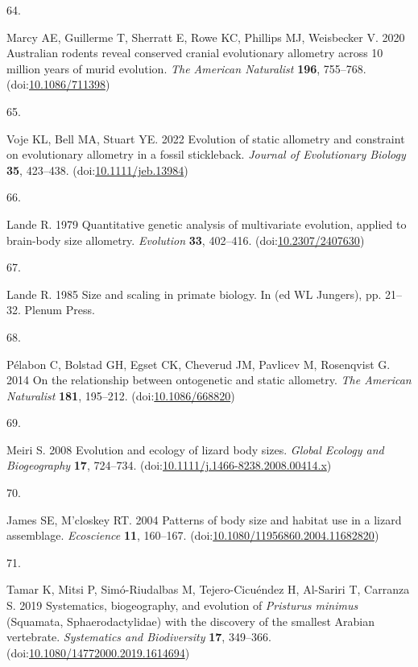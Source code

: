 \documentclass[
  11pt,
]{article}
\newlength{\cslhangindent}
\newlength{\csllabelwidth}
\newlength{\cslentryspacingunit} %
\newenvironment{CSLReferences}[2] %
 {%
  \setlength{\parindent}{0pt}
  \ifodd #1
  \let\oldpar\par
  \def\par{\hangindent=\cslhangindent\oldpar}
  \fi
  \setlength{\parskip}{#2\cslentryspacingunit}
 }%
 {}
\newcommand{\CSLLeftMargin}[1]{\parbox[t]{\csllabelwidth}{#1}}
\newcommand{\CSLRightInline}[1]{\parbox[t]{\linewidth - \csllabelwidth}{#1}\break}
\begin{document}
\begin{CSLReferences}{0}{0}
\leavevmode{}%
\CSLLeftMargin{64. }%
\CSLRightInline{Marcy AE, Guillerme T, Sherratt E, Rowe KC, Phillips MJ,
Weisbecker V. 2020 Australian rodents reveal conserved cranial
evolutionary allometry across 10 million years of murid evolution.
\emph{The American Naturalist} \textbf{196}, 755--768.
(doi:\href{https://doi.org/10.1086/711398}{10.1086/711398})}

\leavevmode{}%
\CSLLeftMargin{65. }%
\CSLRightInline{Voje KL, Bell MA, Stuart YE. 2022 Evolution of static
allometry and constraint on evolutionary allometry in a fossil
stickleback. \emph{Journal of Evolutionary Biology} \textbf{35},
423--438.
(doi:\href{https://doi.org/10.1111/jeb.13984}{10.1111/jeb.13984})}

\leavevmode{}%
\CSLLeftMargin{66. }%
\CSLRightInline{Lande R. 1979 Quantitative genetic analysis of
multivariate evolution, applied to brain-body size allometry.
\emph{Evolution} \textbf{33}, 402--416.
(doi:\href{https://doi.org/10.2307/2407630}{10.2307/2407630})}

\leavevmode{}%
\CSLLeftMargin{67. }%
\CSLRightInline{Lande R. 1985 Size and scaling in primate biology. In
(ed WL Jungers), pp. 21--32. Plenum Press. }

\leavevmode{}%
\CSLLeftMargin{68. }%
\CSLRightInline{Pélabon C, Bolstad GH, Egset CK, Cheverud JM, Pavlicev
M, Rosenqvist G. 2014 On the relationship between ontogenetic and static
allometry. \emph{The American Naturalist} \textbf{181}, 195--212.
(doi:\href{https://doi.org/10.1086/668820}{10.1086/668820})}

\leavevmode{}%
\CSLLeftMargin{69. }%
\CSLRightInline{Meiri S. 2008 Evolution and ecology of lizard body
sizes. \emph{Global Ecology and Biogeography} \textbf{17}, 724--734.
(doi:\href{https://doi.org/10.1111/j.1466-8238.2008.00414.x}{10.1111/j.1466-8238.2008.00414.x})}

\leavevmode{}%
\CSLLeftMargin{70. }%
\CSLRightInline{James SE, M'closkey RT. 2004 Patterns of body size and
habitat use in a lizard assemblage. \emph{Ecoscience} \textbf{11},
160--167.
(doi:\href{https://doi.org/10.1080/11956860.2004.11682820}{10.1080/11956860.2004.11682820})}

\leavevmode{}%
\CSLLeftMargin{71. }%
\CSLRightInline{Tamar K, Mitsi P, Simó-Riudalbas M, Tejero-Cicuéndez H,
Al-Sariri T, Carranza S. 2019 Systematics, biogeography, and evolution
of \emph{{P}risturus minimus} ({S}quamata, {S}phaerodactylidae) with the
discovery of the smallest {A}rabian vertebrate. \emph{Systematics and
Biodiversity} \textbf{17}, 349--366.
(doi:\href{https://doi.org/10.1080/14772000.2019.1614694}{10.1080/14772000.2019.1614694})}


\end{CSLReferences}
\end{document}
